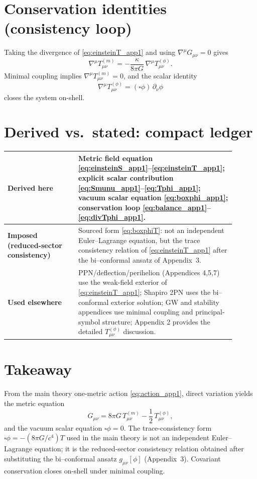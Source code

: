 \documentclass[11pt]{article}
\begin{document}
\section{Conservation identities (consistency loop)}\label{sec:cons_app1}
Taking the divergence of \eqref{eq:einsteinT_app1} and using $\nabla^\mu G_{\mu\nu}=0$ gives
\begin{equation}
\nabla^\mu T^{(m)}_{\mu\nu} = -\frac{\kappa}{8\pi G}\,\nabla^\mu T^{(\phi)}_{\mu\nu}.
\label{eq:balance_app1}
\end{equation}
Minimal coupling implies $\nabla^\mu T^{(m)}_{\mu\nu}=0$, and the scalar identity
\begin{equation}
\nabla^\mu T^{(\phi)}_{\mu\nu}=(\square\phi)\,\partial_\nu\phi
\label{eq:divTphi_app1}
\end{equation}
closes the system on-shell.

\section{Derived vs.\ stated: compact ledger}\label{sec:ledger_app1}
\begin{center}
\begin{tabular}{@{}p{0.28\linewidth}p{0.62\linewidth}@{}}
\toprule
\textbf{Derived here} &
Metric field equation \eqref{eq:einsteinS_app1}--\eqref{eq:einsteinT_app1}; explicit scalar contribution \eqref{eq:Smunu_app1}--\eqref{eq:Tphi_app1}; vacuum scalar equation \eqref{eq:boxphi_app1}; conservation loop \eqref{eq:balance_app1}--\eqref{eq:divTphi_app1}.\\
\midrule
\textbf{Imposed (reduced-sector consistency)} &
Sourced form \eqref{eq:boxphiT}: not an independent Euler--Lagrange equation, but the trace consistency relation of \eqref{eq:einsteinT_app1} after the bi--conformal ansatz of Appendix~3.\\
\midrule
\textbf{Used elsewhere} &
PPN/deflection/perihelion (Appendices 4,5,7) use the weak-field exterior of \eqref{eq:einsteinT_app1}; Shapiro 2PN uses the bi--conformal exterior solution; GW and stability appendices use minimal coupling and principal-symbol structure; Appendix 2 provides the detailed $T^{(\phi)}_{\mu\nu}$ discussion.\\
\bottomrule
\end{tabular}
\end{center}

\section*{Takeaway}
From the main theory one-metric action \eqref{eq:action_app1}, direct variation yields the metric equation
\[
G_{\mu\nu}=8\pi G\,T^{(m)}_{\mu\nu}-\frac12\,T^{(\phi)}_{\mu\nu},
\]
and the vacuum scalar equation $\square\phi=0$. The trace-consistency form $\square\phi=-(8\pi G/c^4)T$ used in the main theory is not an independent Euler--Lagrange equation; it is the reduced-sector consistency relation obtained after substituting the bi--conformal ansatz $g_{\mu\nu}[\phi]$ (Appendix~3). Covariant conservation closes on-shell under minimal coupling.
\end{document}
